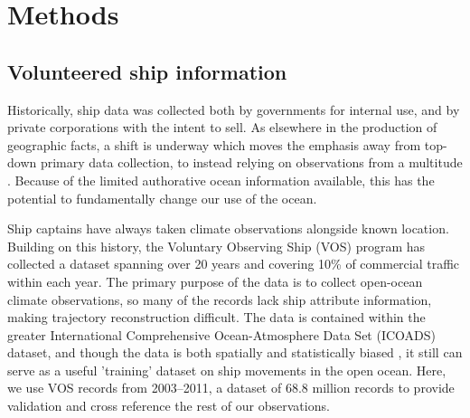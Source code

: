 \section{\textbf{Methods}}



\subsection{Volunteered ship information}


Historically, ship data was collected both by governments for internal use, and by private corporations with the intent to sell. As elsewhere in the production of geographic facts, a shift is underway which moves the emphasis away from top-down primary data collection, to instead relying on observations from a multitude \citep{goodchild1999cartographic,goodchild2007citizens,elwood2011researching}. Because of the limited authorative ocean information available, this has the potential to fundamentally change our use of the ocean.

Ship captains have always taken climate observations alongside known location. %
Building on this history, the Voluntary Observing Ship (VOS) \citep{VOSOverview} program has collected a dataset spanning over 20 years and covering 10\% of commercial traffic within each year. The primary purpose of the data is to collect open-ocean climate observations, so many of the records lack ship attribute information, making trajectory reconstruction difficult. The data is contained within the greater International Comprehensive Ocean-Atmosphere Data Set (ICOADS) dataset, and though the data is both spatially and statistically biased \citep{Wang2007}, it still can serve as a useful 'training' dataset on ship movements in the open ocean. Here, we use VOS records from 2003--2011, a dataset of 68.8 %
million records to provide validation and cross reference the rest of our observations.

